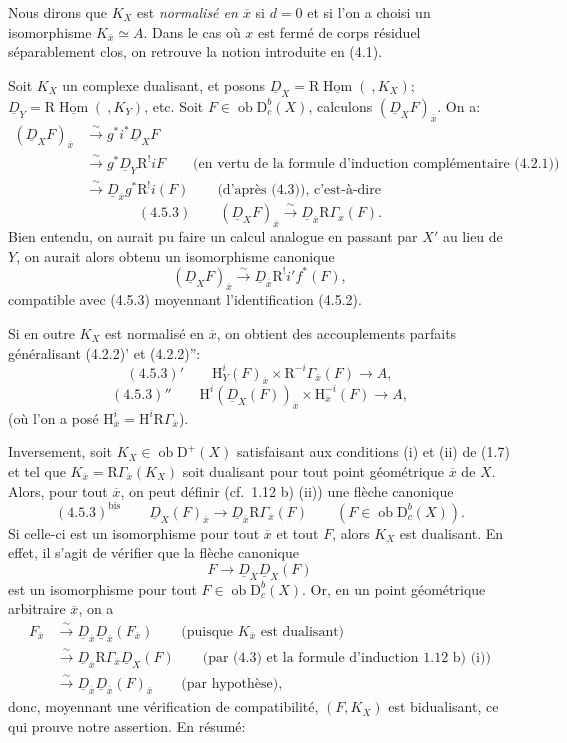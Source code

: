 \documentclass[11pt]{article}
\renewcommand{\H}{\mathrm{H}}
\DeclareMathOperator{\Hom}{Hom}
\newcommand{\R}{\mathrm{R}}
\newcommand{\D}{\mathrm{D}}
\newcommand{\ob}{\operatorname{ob}}
\newcommand{\ol}[1]{\overline{#1}}
\providecommand{\Hom}{\operatorname{Hom}}
\providecommand{\ob}{\operatorname{ob}}
\providecommand{\R}{\mathrm R}
\begin{document}
Nous dirons que $K_X$ est \emph{normalisé en $\ol{x}$} si $d=0$ et si l'on a choisi un isomorphisme $K_{\ol{x}}\simeq A$. Dans le cas où $x$ est fermé de corps résiduel séparablement clos, on retrouve la notion introduite en (4.1).

Soit $K_X$ un complexe dualisant, et posons $\underline{D}_X=\R\underline{\Hom}(\ ,K_X)$; $\underline{D}_Y=\R\underline{\Hom}(\ ,K_Y)$, etc. Soit $F\in\ob\D_c^b(X)$, calculons $(\underline{D}_XF)_{\ol{x}}$. On a:
\[
\begin{aligned}
(\underline{D}_XF)_{\ol{x}}&\xrightarrow{\sim}g^*i^*\underline{D}_X F\\
&\xrightarrow{\sim}g^*\underline{D}_Y\R^{!}iF\qquad\text{(en vertu de la formule d'induction complémentaire (4.2.1))}\\
&\xrightarrow{\sim}\underline{D}_{\ol{x}}g^*\R^{!}i(F)\qquad\text{(d'après (4.3)), c'est-à-dire}
\end{aligned}
\]
\[
(4.5.3)\qquad (\underline{D}_X F)_{\ol{x}}\xrightarrow{\sim}\underline{D}_{\ol{x}}\R\Gamma_{\ol{x}}(F).
\]
Bien entendu, on aurait pu faire un calcul analogue en passant par $X'$ au lieu de $Y$, on aurait alors obtenu un isomorphisme canonique
\[
(\underline{D}_XF)_{\ol{x}}\xrightarrow{\sim}\underline{D}_{\ol{x}}\R^{!}i'f^*(F),
\]
compatible avec (4.5.3) moyennant l'identification (4.5.2).

Si en outre $K_X$ est normalisé en $\ol{x}$, on obtient des accouplements parfaits généralisant (4.2.2)' et (4.2.2)'':
\[
(4.5.3)'\qquad \H_Y^i(F)_{\ol{x}}\times \R^{-i}\Gamma_{\ol{x}}(F)\longrightarrow A,
\]
\[
(4.5.3)''\qquad \H^i(\underline{D}_X(F))_{\ol{x}}\times \H_{\ol{x}}^{-i}(F)\longrightarrow A,
\]
(où l'on a posé $\H_{\ol{x}}^i=\H^i\R\Gamma_{\ol{x}}$).

Inversement, soit $K_X\in\ob\D^+(X)$ satisfaisant aux conditions (i) et (ii) de (1.7) et tel que $K_{\ol{x}}=\R\Gamma_{\ol{x}}(K_X)$ soit dualisant pour tout point géométrique $\ol{x}$ de $X$. Alors, pour tout $\ol{x}$, on peut définir (cf.~1.12 b) (ii)) une flèche canonique
\[
(4.5.3)^{\mathrm{bis}}\qquad \underline{D}_X(F)_{\ol{x}}\longrightarrow \underline{D}_{\ol{x}}\R\Gamma_{\ol{x}}(F)\qquad (F\in\ob\D_c^b(X)).
\]
Si celle-ci est un isomorphisme pour tout $\ol{x}$ et tout $F$, alors $K_X$ est dualisant. En effet, il s'agit de vérifier que la flèche canonique
\[
F\longrightarrow \underline{D}_X\underline{D}_X(F)
\]
est un isomorphisme pour tout $F\in\ob\D_c^b(X)$. Or, en un point géométrique arbitraire $\ol{x}$, on a
\[
\begin{aligned}
F_{\ol{x}}&\xrightarrow{\sim}\underline{D}_{\ol{x}}\underline{D}_{\ol{x}}(F_{\ol{x}})\qquad\text{(puisque $K_{\ol{x}}$ est dualisant)}\\
&\xrightarrow{\sim}\underline{D}_{\ol{x}}\R\Gamma_{\ol{x}}\underline{D}_X(F)\qquad\text{(par (4.3) et la formule d'induction 1.12 b) (i))}\\
&\xrightarrow{\sim}\underline{D}_{\ol{x}}\underline{D}_{\ol{x}}(F)_{\ol{x}}\qquad\text{(par hypothèse)},
\end{aligned}
\]
donc, moyennant une vérification de compatibilité, $(F,K_X)$ est bidualisant, ce qui prouve notre assertion. En résumé:
\end{document}
